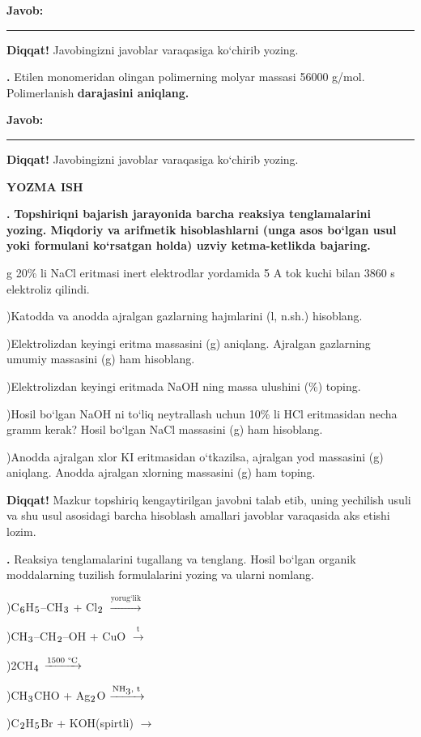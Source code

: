 \documentclass[11pt,a4paper]{article}
\renewcommand{\textsubscript}[1]{\ensuremath{_{\text{\fontsize{8}{8}\selectfont #1}}}}
\newcommand{\qn}[1]{\textbf{\fontsize{11.5}{13}\selectfont #1}}
\newcommand{\qsep}{\par\vspace{1pt}\noindent\rule{0pt}{0.4pt}\par\vspace{5pt}}
\newcommand{\diqqat}[1]{\par\smallskip\noindent\textbf{Diqqat!} #1\par\medskip}
\newcommand{\javob}{\par\smallskip\noindent\textbf{Javob:} \rule[-2pt]{7.5cm}{0.4pt}\par\smallskip\noindent\textbf{Diqqat!} Javobingizni javoblar varaqasiga ko`chirib yozing.\par\medskip}
\begin{document}
\javob\qsep
\noindent\qn{40.} Etilen monomeridan olingan polimerning molyar massasi 56000 g/mol. Polimerlanish \textbf{darajasini aniqlang.}
\javob\qsep
\par\bigskip\begin{center}\textbf{\fontsize{13}{15}\selectfont YOZMA ISH}\end{center}
\noindent\qn{41.} \textbf{Topshiriqni bajarish jarayonida barcha reaksiya tenglamalarini yozing. Miqdoriy va arifmetik hisoblashlarni (unga asos bo`lgan usul yoki formulani ko`rsatgan holda) uzviy ketma-ketlikda bajaring.}\par{} g 20\% li NaCl eritmasi inert elektrodlar yordamida 5 A tok kuchi bilan 3860 s elektroliz qilindi.\par
{})Katodda va anodda ajralgan gazlarning hajmlarini (l, n.sh.) hisoblang.\par
{})Elektrolizdan keyingi eritma massasini (g) aniqlang. Ajralgan gazlarning umumiy massasini (g) ham hisoblang.\par
{})Elektrolizdan keyingi eritmada NaOH ning massa ulushini (\%) toping.\par
{})Hosil bo`lgan NaOH ni to`liq neytrallash uchun 10\% li HCl eritmasidan necha gramm kerak? Hosil bo`lgan NaCl massasini (g) ham hisoblang.\par
{})Anodda ajralgan xlor KI eritmasidan o`tkazilsa, ajralgan yod massasini (g) aniqlang. Anodda ajralgan xlorning massasini (g) ham toping.\par
\diqqat{Mazkur topshiriq kengaytirilgan javobni talab etib, uning yechilish usuli va shu usul asosidagi barcha hisoblash amallari javoblar varaqasida aks etishi lozim.}\qsep
\noindent\qn{42.} Reaksiya tenglamalarini tugallang va tenglang. Hosil bo`lgan organik moddalarning tuzilish formulalarini yozing va ularni nomlang.\par
{})C\textsubscript{6}H\textsubscript{5}--CH\textsubscript{3} + Cl\textsubscript{2} $\xrightarrow{\text{yorug`lik}}$\par
{})CH\textsubscript{3}--CH\textsubscript{2}--OH + CuO $\xrightarrow{\text{t}}$\par
{})2CH\textsubscript{4} $\xrightarrow{\text{1500 \textdegree{}C}}$\par
{})CH\textsubscript{3}CHO + Ag\textsubscript{2}O $\xrightarrow{\text{NH\textsubscript{3}, t}}$\par
{})C\textsubscript{2}H\textsubscript{5}Br + KOH(spirtli) $\to$\par
\end{document}
